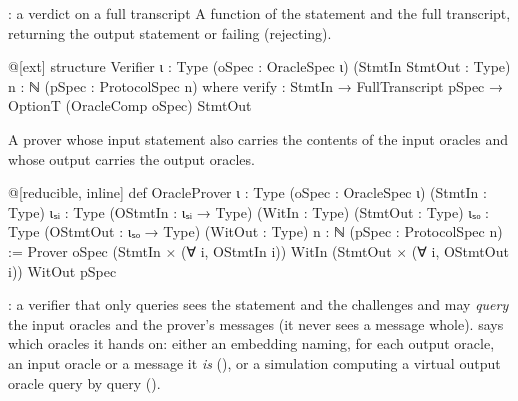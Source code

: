 
\begin{define}{: a verdict on a full transcript}
A function of the statement and the full transcript, returning the output statement or failing
(rejecting).
\end{define}

\begin{leancode}
@[ext]
structure Verifier {ι : Type} (oSpec : OracleSpec ι)
    (StmtIn StmtOut : Type) {n : ℕ} (pSpec : ProtocolSpec n) where
  verify : StmtIn → FullTranscript pSpec → OptionT (OracleComp oSpec) StmtOut
\end{leancode}


\begin{define}{}
A prover whose input statement also carries the contents of the input oracles and whose output
carries the output oracles.
\end{define}

\begin{leancode}
@[reducible, inline]
def OracleProver {ι : Type} (oSpec : OracleSpec ι)
    (StmtIn : Type) {ιₛᵢ : Type} (OStmtIn : ιₛᵢ → Type) (WitIn : Type)
    (StmtOut : Type) {ιₛₒ : Type} (OStmtOut : ιₛₒ → Type) (WitOut : Type)
    {n : ℕ} (pSpec : ProtocolSpec n) :=
  Prover oSpec (StmtIn × (∀ i, OStmtIn i)) WitIn (StmtOut × (∀ i, OStmtOut i)) WitOut pSpec
\end{leancode}


\begin{define}{: a verifier that only queries}
 sees the statement and the challenges and may \emph{query} the input oracles and
the prover's messages (it never sees a message whole).  says which oracles it
hands on: either an embedding naming, for each output oracle, an input oracle or a message it
\emph{is} (), or a simulation computing a virtual output oracle query
by query ().
\end{define}

